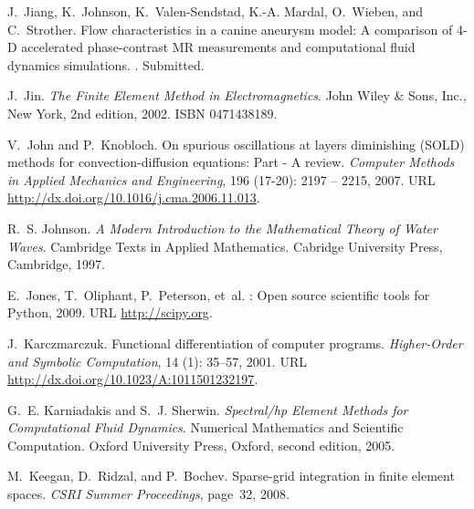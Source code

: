 \begin{thebibliography}{467}
J.~Jiang, K.~Johnson, K.~Valen-Sendstad, K.-A. Mardal, O.~Wieben, and
  C.~Strother.
\newblock Flow characteristics in a canine aneurysm model: A comparison of
  {4-D} accelerated phase-contrast {MR} measurements and computational fluid
  dynamics simulations.
.
\newblock Submitted.

J.~Jin.
\newblock \emph{The Finite Element Method in Electromagnetics}.
\newblock John Wiley \& Sons, Inc., New York, 2nd edition, 2002.
\newblock ISBN 0471438189.

V.~John and P.~Knobloch.
\newblock On spurious oscillations at layers diminishing ({SOLD}) methods for
  convection-diffusion equations: {P}art - {A} review.
\newblock \emph{Computer Methods in Applied Mechanics and Engineering},
  196 (17-20): 2197 -- 2215, 2007.
\newblock URL \url{http://dx.doi.org/10.1016/j.cma.2006.11.013}.

R.~S. Johnson.
\newblock \emph{A Modern Introduction to the Mathematical Theory of Water
  Waves}.
\newblock Cambridge Texts in Applied Mathematics. Cabridge University Press,
  Cambridge, 1997.

E.~Jones, T.~Oliphant, P.~Peterson, et~al.
: Open source scientific tools for {Python}, 2009.
\newblock URL \url{http://scipy.org}.

J.~Karczmarczuk.
\newblock Functional differentiation of computer programs.
\newblock \emph{Higher-Order and Symbolic Computation}, 14
  (1): 35--57, 2001.
\newblock URL \url{http://dx.doi.org/10.1023/A:1011501232197}.

G.~E. Karniadakis and S.~J. Sherwin.
\newblock \emph{Spectral/hp Element Methods for Computational Fluid Dynamics}.
\newblock Numerical Mathematics and Scientific Computation. Oxford University
  Press, Oxford, second edition, 2005.

M.~Keegan, D.~Ridzal, and P.~Bochev.
\newblock Sparse-grid integration in finite element spaces.
\newblock \emph{CSRI Summer Proceedings}, page~32, 2008.


\end{thebibliography}
